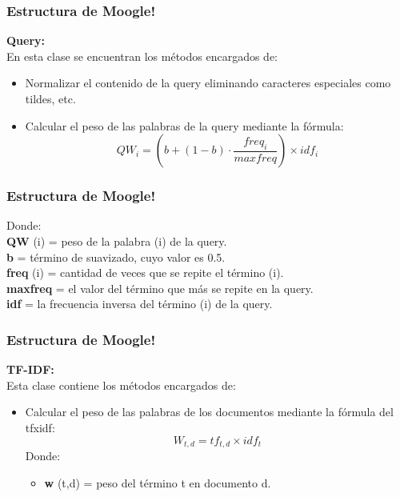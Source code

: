 \documentclass{beamer}
\begin{document}
\begin{frame}
    \frametitle{Estructura de Moogle!}
\textbf{\Large Query:}\\
 \Large En esta clase se encuentran los m\'etodos encargados de:\\
 \begin{itemize}
    \item Normalizar el contenido de la query eliminando caracteres especiales como tildes, etc.
    \item Calcular el peso de las palabras de la query mediante la f\'ormula:\\
    \begin{equation}
        QW_i = ( b +(1-b)\cdot \frac{freq_i}{maxfreq})\times idf_i
    \end{equation}
    
 \end{itemize}
\end{frame}

\begin{frame}
    \frametitle{Estructura de Moogle!}
   \Large Donde:\\ \textbf{QW} (i) = peso de la palabra (i) de la query.\\
   \textbf{b} = t\'ermino de suavizado, cuyo valor es 0.5.\\ \textbf{freq} (i) = cantidad de veces que se repite el t\'ermino (i).\\ \textbf{maxfreq} = el valor
   del t\'ermino que m\'as se repite en la query.\\ \textbf{idf} = la frecuencia inversa del t\'ermino (i) de la query.
\end{frame}

\begin{frame}
    \frametitle{Estructura de Moogle!}
    \textbf{\Large TF-IDF:}\\ \Large Esta clase contiene los m\'etodos encargados de:\\
    \begin{itemize}
        \item Calcular el peso de las palabras de los documentos mediante la f\'ormula del tfxidf:\\
         \begin{equation}
            W_{t,d} = tf_{t,d}\times idf_t
         \end{equation}
         \Large Donde:\\
          \begin{itemize}
            \item \textbf{w} (t,d) = peso del t\'ermino t en documento d.
         \end{itemize}
    \end{itemize}
\end{frame}
\end{document}
